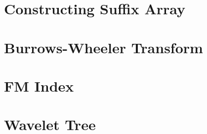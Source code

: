 \documentclass[nobib]{tufte-book}
\begin{document}
\chapter{Constructing Suffix Array}


\chapter{Burrows-Wheeler Transform}

\chapter{FM Index}

\chapter{Wavelet Tree}

\backmatter




\printindex
\end{document}
